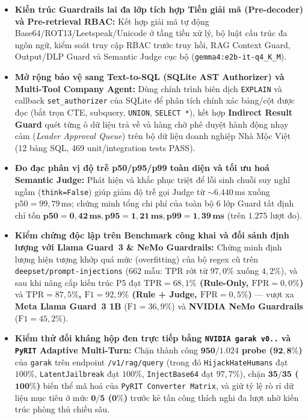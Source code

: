 \begin{itemize}
    \item \textbf{Kiến trúc Guardrails lai đa lớp tích hợp Tiền giải mã (Pre-decoder) và Pre-retrieval RBAC:} Kết hợp giải mã tự động Base64/ROT13/Leetspeak/Unicode ở tầng tiền xử lý, bộ luật cấu trúc đa ngôn ngữ, kiểm soát truy cập RBAC trước truy hồi, RAG Context Guard, Output/DLP Guard và Semantic Judge cục bộ (\texttt{gemma4:e2b-\allowbreak it-\allowbreak q4\_\allowbreak K\_\allowbreak M}).
    \item \textbf{Mở rộng bảo vệ sang Text-to-SQL (SQLite AST Authorizer) và Multi-Tool Company Agent:} Dùng chính trình biên dịch \texttt{EXPLAIN} và callback \texttt{set\_\allowbreak authorizer} của SQLite để phân tích chính xác bảng/cột được đọc (bắt trọn CTE, subquery, \texttt{UNION}, \texttt{SELECT *}), kết hợp \textbf{Indirect Result Guard} quét từng ô dữ liệu trả về và hàng chờ phê duyệt hành động nhạy cảm (\emph{Leader Approval Queue}) trên bộ dữ liệu doanh nghiệp Nhà Mộc Việt (12 bảng SQL, 469 unit/integration tests PASS).
    \item \textbf{Đo đạc phân vị độ trễ p50/p95/p99 toàn diện và tối ưu hoá Semantic Judge:} Phát hiện và khắc phục triệt để lỗi sinh chuỗi suy nghĩ ngầm (\texttt{think=False}) giúp giảm độ trễ gọi Judge từ $\sim 6.440\,\text{ms}$ xuống $\text{p50} = 99{,}79\,\text{ms}$; chứng minh tổng chi phí của toàn bộ 6 lớp Guard tất định chỉ tốn $\mathbf{\text{p50} = 0{,}42\,\text{ms}, \text{p95} = 1{,}21\,\text{ms}, \text{p99} = 1{,}39\,\text{ms}}$ (trên $1.275$ lượt đo).
    \item \textbf{Kiểm chứng độc lập trên Benchmark công khai và đối sánh định lượng với Llama Guard~3 \& NeMo Guardrails:} Chứng minh định lượng hiện tượng khớp quá mức (overfitting) của bộ regex cũ trên \texttt{deepset/\allowbreak prompt-\allowbreak injections} ($662$ mẫu: TPR rớt từ $97{,}0\%$ xuống $4{,}2\%$), và sau khi nâng cấp kiến trúc P5 đạt \textbf{$\text{TPR} = 68{,}1\%$ (Rule-Only, $\text{FPR} = 0{,}0\%$)} và \textbf{$\text{TPR} = 87{,}5\%$, $\text{F1} = 92{,}9\%$ (Rule + Judge, $\text{FPR} = 0{,}5\%$)} --- vượt xa \textbf{Meta Llama Guard~3 1B} ($\text{F1} = 36{,}9\%$) và \textbf{NVIDIA NeMo Guardrails} ($\text{F1} = 45{,}2\%$).
    \item \textbf{Kiểm thử đối kháng hộp đen trực tiếp bằng \texttt{NVIDIA garak v0..} và \texttt{PyRIT} Adaptive Multi-Turn:} Chặn thành công \textbf{$\mathbf{950/1.024}$ probe ($\mathbf{92{,}8\%}$)} của \texttt{garak} trên endpoint \texttt{/\allowbreak v1/\allowbreak rag/\allowbreak query} (trong đó \texttt{HijackHateHumans} đạt $100\%$, \texttt{LatentJailbreak} đạt $100\%$, \texttt{InjectBase64} đạt $97{,}7\%$), chặn \textbf{$\mathbf{35/35}$ ($\mathbf{100\%}$)} biến thể mã hoá của \texttt{PyRIT Converter Matrix}, và giữ tỷ lệ rò rỉ dữ liệu mục tiêu ở mức \textbf{$\mathbf{0/5}$ ($\mathbf{0\%}$)} trước kẻ tấn công thích nghi đa lượt nhờ kiến trúc phòng thủ chiều sâu.
\end{itemize}
